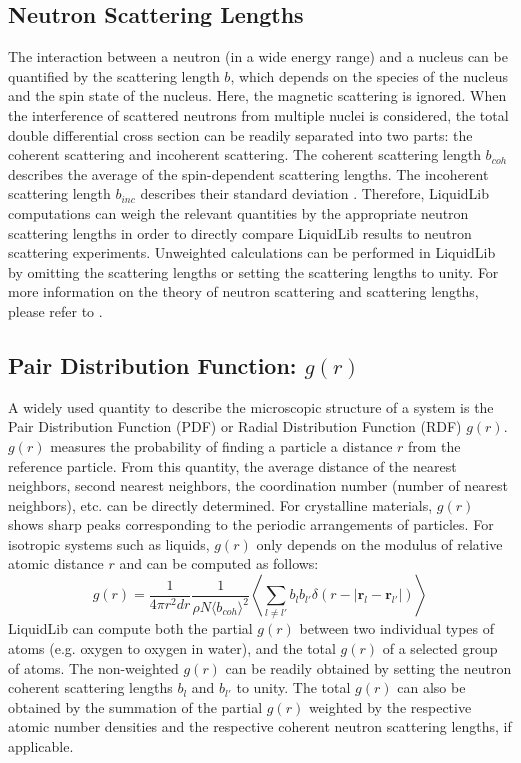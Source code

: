 \documentclass{article}
\begin{document}
\subsection{Neutron Scattering Lengths}
The interaction between a neutron (in a wide energy range) and a nucleus can be quantified by the scattering length $b$, which depends on the species of the nucleus and the spin state of the nucleus. Here, the magnetic scattering is ignored. When the interference of scattered neutrons from multiple nuclei is considered, the total double differential cross section can be readily separated into two parts: the coherent scattering and incoherent scattering. The coherent scattering length $b_{coh}$ describes the average of the spin-dependent scattering lengths. The incoherent scattering length $b_{inc}$ describes their standard deviation \cite{Squires}. Therefore, LiquidLib computations can weigh the relevant quantities by the appropriate neutron scattering lengths in order to directly compare LiquidLib results to neutron scattering experiments. Unweighted calculations can be performed in LiquidLib by omitting the scattering lengths or setting the scattering lengths to unity. For more information on the theory of neutron scattering and scattering lengths, please refer to \cite{EGELSTAFF, Hansen, Squires}.

\subsection{Pair Distribution Function: $g(r)$} \label{sec::gofr}
A widely used quantity to describe the microscopic structure of a system is the Pair Distribution Function (PDF) or Radial Distribution Function (RDF) $g(r)$. $g(r)$ measures the probability of finding a particle a distance $r$ from the reference particle. From this quantity, the average distance of the nearest neighbors, second nearest neighbors, the coordination number (number of nearest neighbors), etc. can be directly determined. For crystalline materials, $g(r)$ shows sharp peaks corresponding to the periodic arrangements of particles. For isotropic systems such as liquids, $g(r)$ only depends on the modulus of relative atomic distance $r$ and can be computed as follows:
\begin{equation}
	g(r) = \frac{1}{4\pi r^2dr} \frac{1}{\rho N \langle b_{coh}\rangle^2}\left\langle\sum\limits_{l\neq l'} b_l b_{l'}\delta(r-|\mathbf{r}_l-\mathbf{r}_{l'}|)\right\rangle
\end{equation}
LiquidLib can compute both the partial $g(r)$ between two individual types of atoms (e.g. oxygen to oxygen in water), and the total $g(r)$ of a selected group of atoms. The non-weighted $g(r)$ can be readily obtained by setting the neutron coherent scattering lengths $b_l$ and $b_{l'}$ to unity. The total $g(r)$ can also be obtained by the summation of the partial $g(r)$ weighted by the respective atomic number densities and the respective coherent neutron scattering lengths, if applicable.
\end{document}
